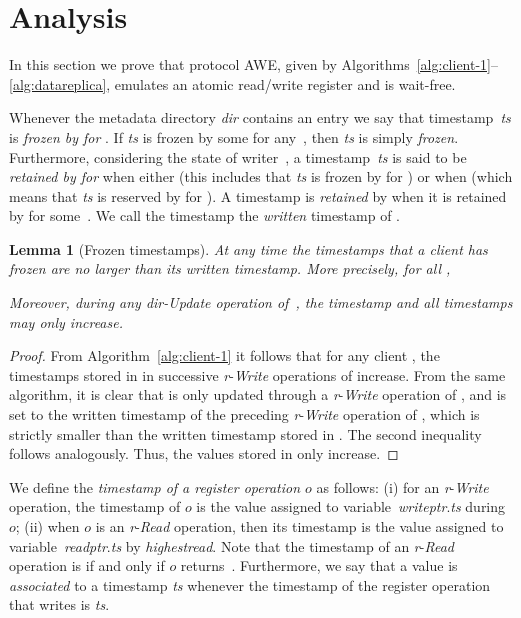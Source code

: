 \documentclass[oribibl]{llncs}
\newtheorem{lemma}[theorem]{Lemma}
\theoremstyle{definition-boldhead}
\newcommand{\var}[1]{\textit{#1}}
\newcommand{\op}[1]{\textsl{#1}}
\newcommand{\dir}{\var{dir}\xspace}
\newcommand{\NAME}{AWE\xspace}
\begin{document}
\if\submit\no
\section{Analysis}
\label{sec:proof}
\fi

\newcommand{\opr}{\ensuremath{o}\xspace}
\newcommand{\popr}{\ensuremath{o'}\xspace}
\newcommand{\opread}{\ensuremath{\op{Read}}\xspace}
\newcommand{\opwrite}{\ensuremath{\op{Write}}\xspace}
\newcommand{\tsopr}{\ensuremath{\var{ts}}\xspace}
\newcommand{\tspopr}{\ensuremath{\var{ts}'}\xspace}

\if\submit\no
In this section we prove that protocol \NAME, given by
Algorithms~\ref{alg:client-1}--\ref{alg:datareplica}, emulates an
atomic read/write register and is wait-free.

Whenever the metadata directory \var{dir} contains an entry  we say that timestamp~\var{ts}
is \emph{frozen by  for }.  If \var{ts} is frozen by some 
for any~, then \var{ts} is simply \emph{frozen}.  Furthermore,
considering the state of writer~, a timestamp~\var{ts} is said to
be \emph{retained by  for } when either
 (this includes that
\var{ts} is frozen by  for ) or when
 (which means that
\var{ts} is reserved by  for ).  A timestamp is \emph{retained}
by  when it is retained by  for some~.  We call the timestamp
 the \emph{written} timestamp of .

\begin{lemma}[Frozen timestamps]\label{lem:timestamps}
  At any time the timestamps that a client has frozen
  are no larger than its written timestamp. More precisely, for all
  ,
  
  Moreover, during any \dir-\op{Update} operation of~, the
  timestamp  and all timestamps
   may only increase.
\end{lemma}

\begin{proof}
  From Algorithm~\ref{alg:client-1} it follows that for any client , the
  timestamps stored in  in successive
  \var{r}-\op{Write} operations of  increase.
  From the same algorithm, it is clear that
   is only updated through a
  \var{r}-\op{Write} operation of , and is set to the written timestamp
  of the preceding \var{r}-\op{Write} operation of , which is
  strictly smaller than the written timestamp stored in
  .  The second inequality
  follows analogously.  Thus, the values stored in
   only increase.
\end{proof}

We define the \emph{timestamp of a register operation \opr} as
follows: (i) for an \var{r}-\op{Write} operation, the timestamp of
\opr is the value assigned to variable~\var{writeptr}.\var{ts}
during~\opr; (ii) when \opr is an \var{r}-\op{Read} operation, then
its timestamp is the value assigned to variable~\var{readptr}.\var{ts}
by \op{highestread}.  Note that the timestamp of an \var{r}-\op{Read}
operation is  if and only if \opr returns~.
Furthermore, we say that a value  is \emph{associated} to a
timestamp \var{ts} whenever the timestamp of the register operation
that writes  is \var{ts}.
\end{document}
